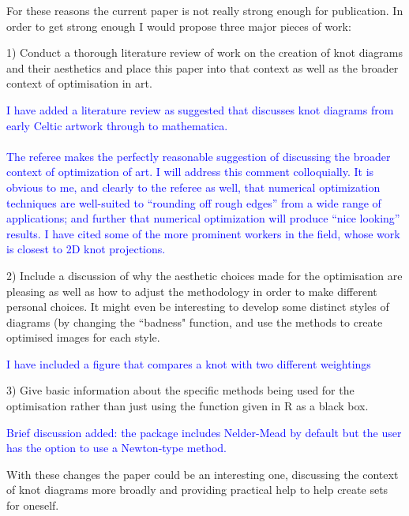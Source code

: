 \documentclass[12pt]{article}
\begin{document}
For these reasons the current paper is not really strong enough for
publication. In order to get strong enough I would propose three major
pieces of work:

1) Conduct a thorough literature review of work on the creation of
knot diagrams and their aesthetics and place this paper into that
context as well as the broader context of optimisation in art. %

\textcolor{blue}{I have added a literature review as suggested that
  discusses knot diagrams from early Celtic artwork through to
  mathematica.\\ \\ The referee makes the perfectly reasonable
  suggestion of discussing the broader context of optimization of art.
  I will address this comment colloquially.  It is obvious to me, and
  clearly to the referee as well, that numerical optimization
  techniques are well-suited to ``rounding off rough edges'' from a
  wide range of applications; and further that numerical optimization
  will produce ``nice looking'' results.  I have cited some of the
  more prominent workers in the field, whose work is closest to 2D
  knot projections.}

2) Include a discussion of why the aesthetic choices made for the
optimisation are pleasing as well as how to adjust the methodology in
order to make different personal choices. It might even be interesting
to develop some distinct styles of diagrams (by changing the ``badness"
function, and use the methods to create optimised images for each
style.

\textcolor{blue}{I have included a figure that compares a knot with
  two different weightings}


3) Give basic information about the specific methods being used for
the optimisation rather than just using the function given in R as a
black box.


\textcolor{blue}{Brief discussion added: the package includes
  Nelder-Mead by default but the user has the option to use a
  Newton-type method.}

With these changes the paper could be an interesting one, discussing
the context of knot diagrams more broadly and providing practical help
to help create sets for oneself.
\end{document}
